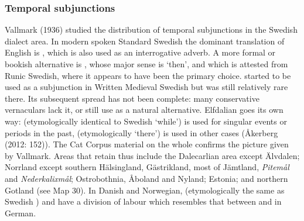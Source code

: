 \subsubsection[Temporal subjunctions]{\rmfamily Temporal subjunctions}
Vallmark (1936) studied the distribution of temporal subjunctions in the Swedish dialect area. In modern spoken Standard Swedish the dominant translation of English  is , which is also used as an interrogative adverb. A more formal or bookish alternative is , whose major sense is ‘then’, and which is attested from Runic Swedish, where it appears to have been the primary choice. started to be used as a subjunction in Written Medieval Swedish but was still relatively rare there. Its subsequent spread has not been complete: many conservative vernaculars lack it, or still use as a natural alternative. Elfdalian goes its own way:  (etymologically identical to Swedish  ‘while’) is used for singular events or periods in the past,  (etymologically ‘there’) is used in other cases (Åkerberg (2012: 152)). The Cat Corpus material on the whole confirms the picture given by Vallmark. Areas that retain  thus include the Dalecarlian area except Älvdalen; Norrland except southern Hälsingland, Gästrikland, most of Jämtland, \textit{Pitemål} and \textit{Nederkalixmål}; Ostrobothnia, Åboland and Nyland; Estonia; and northern Gotland (see Map 30). In Danish and Norwegian,  (etymologically the same as Swedish ) and  have a division of labour which resembles that between  and  in German. 

